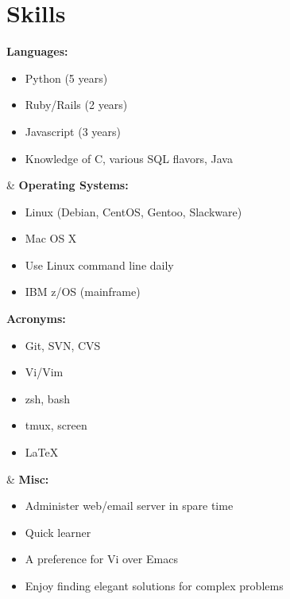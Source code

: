 
\section{Skills}
\ifskillsGrid


\begin{ncolumn}{2}
  {\bf Languages:}
  \begin{itemize}
  \item Python (5 years)
  \item Ruby/Rails (2 years)
  \item Javascript (3 years)
  \item Knowledge of C, various SQL flavors, Java
  \end{itemize}
&
  {\bf Operating Systems:}
  \begin{itemize}
  \item Linux (Debian, CentOS, Gentoo, Slackware)
  \item Mac OS X
  \item Use Linux command line daily
  \item IBM z/OS (mainframe)
  \end{itemize}
\end{ncolumn}

\begin{ncolumn}{2}
  {\bf Acronyms:}
  \begin{itemize}
  \item Git, SVN, CVS
  \item Vi/Vim
  \item zsh, bash
  \item tmux, screen
  \item \LaTeX
  \end{itemize}
&
  {\bf Misc:}
  \begin{itemize}
  \item Administer web/email server in spare time
  \item Quick learner
  \item A preference for Vi over Emacs
  \item Enjoy finding elegant solutions for complex problems
  \end{itemize}
\end{ncolumn}


